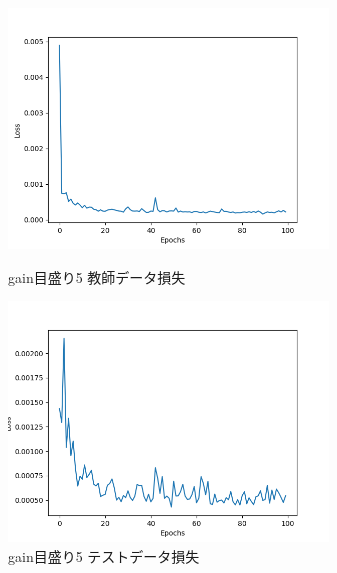 \documentclass{jreport}		%
\begin{document}
\newpage
\begin{figure}[htbp]
 \begin{minipage}{0.5\hsize}
  \begin{center}
   \includegraphics[width=85mm]{gain5_loss.png}
  \end{center}
  \caption{gain目盛り5 教師データ損失}
  \label{fig:one}
 \end{minipage}
 \begin{minipage}{0.5\hsize}
  \begin{center}
   \includegraphics[width=85mm]{gain5_val_loss.png}
  \end{center}
  \caption{gain目盛り5 テストデータ損失}
  \label{fig:two}
 \end{minipage}
\end{figure}
\end{document}
